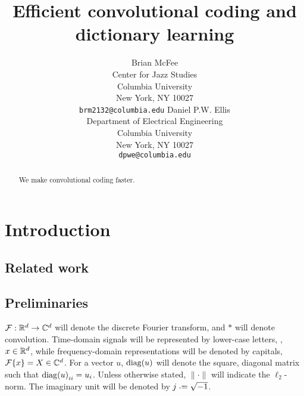 \documentclass{article} %
\title{Efficient convolutional coding and dictionary learning}
\author{
Brian McFee\\
Center for Jazz Studies\\
Columbia University\\
New York, NY 10027 \\
\texttt{brm2132@columbia.edu}
\And
Daniel P.W. Ellis\\
Department of Electrical Engineering\\
Columbia University\\
New York, NY 10027\\
\texttt{dpwe@columbia.edu}
}
\begin{document}
\maketitle

\begin{abstract}
We make convolutional coding faster.
\end{abstract}

\section{Introduction}
\cite{mairal2010}


\subsection{Related work}
\cite{grosse2007}

\subsection{Preliminaries}
$\mathcal{F}:\mathbb{R}^d\rightarrow\mathbb{C}^d$ will denote the discrete Fourier transform, and $*$ will denote
convolution.
Time-domain signals will be represented by lower-case letters, \eg, $x \in \mathbb{R}^d$, while
frequency-domain representations will be denoted by capitals, $\mathcal{F}\{x\} = X \in \mathbb{C}^d$.
For a vector $u$, $\operatorname{diag}(u)$ will denote the square, diagonal matrix such that 
${\operatorname{diag}(u)}_{ii} = u_i$.  Unless otherwise stated, $\|\cdot\|$ will indicate the
$\ell_2$-norm.  The imaginary unit will be denoted by $j \defeq \sqrt{-1}$.
\end{document}
